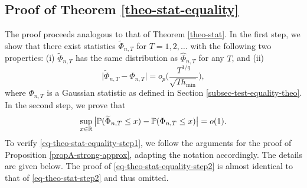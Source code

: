 \documentclass[a4paper,12pt]{article}
\begin{document}
\subsection*{Proof of Theorem \ref{theo-stat-equality}}


The proof proceeds analogous to that of Theorem \ref{theo-stat}. In the first step, we show that there exist statistics $\widetilde{\Phi}_{n,T}$ for $T = 1,2,\ldots$ with the following two properties: (i) $\widetilde{\Phi}_{n,T}$ has the same distribution as $\widehat{\Phi}_{n,T}$ for any $T$, and (ii)
\begin{equation}\label{eq-theo-stat-equality-step1}
\big| \widetilde{\Phi}_{n,T} - \Phi_{n,T} \big| = o_p \Big( \frac{T^{1/q}}{\sqrt{T h_{\min}}} \Big), 
\end{equation}
where $\Phi_{n,T}$ is a Gaussian statistic as defined in Section \ref{subsec-test-equality-theo}. In the second step, we prove that 
\begin{equation}\label{eq-theo-stat-equality-step2}
\sup_{x \in \mathbb{R}} \big| \mathbb{P}(\widetilde{\Phi}_{n,T} \le x) - \mathbb{P}(\Phi_{n,T} \le x) \big| = o(1). 
\end{equation}
To verify \eqref{eq-theo-stat-equality-step1}, we follow the arguments for the proof of Proposition \ref{propA-strong-approx}, adapting the notation accordingly. The details are given below. The proof of \eqref{eq-theo-stat-equality-step2} is almost identical to that of \eqref{eq-theo-stat-step2} and thus omitted. 
\end{document}
